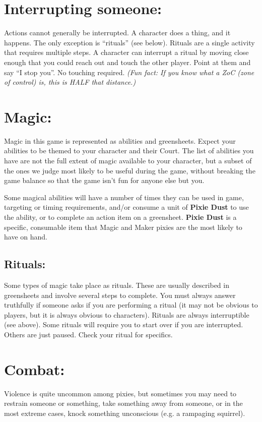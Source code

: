 \documentclass[sheet]{PP}
\begin{document}

\section*{Interrupting someone:}
Actions cannot generally be interrupted. A character does a thing, and it happens. The only exception is ``rituals'' (see below). Rituals are a single activity that requires multiple steps. A character can interrupt a ritual by moving close enough that you could reach out and touch the other player. Point at them and say ``I stop you''. No touching required. \textit{(Fun fact: If you know what a ZoC (zone of control) is, this is HALF that distance.)}

\section*{Magic:}
Magic in this game is represented as abilities and greensheets. Expect your abilities to be themed to your character and their Court. The list of abilities you have are not the full extent of magic available to your character, but a subset of the ones we judge most likely to be useful during the game, without breaking the game balance so that the game isn’t fun for anyone else but you.

Some magical abilities will have a number of times they can be used in game, targeting or timing requirements, and/or consume a unit of \textbf{Pixie Dust} to use the ability, or to complete an action item on a greensheet. \textbf{Pixie Dust} is a specific, consumable item that Magic and Maker pixies are the most likely to have on hand.

\subsection*{Rituals:}
Some types of magic take place as rituals. These are usually described in greensheets and involve several steps to complete. You must always answer truthfully if someone asks if you are performing a ritual (it may not be obvious to players, but it is always obvious to characters). Rituals are always interruptible (see above). Some rituals will require you to start over if you are interrupted. Others are just paused. Check your ritual for specifics.

\section*{Combat:}
Violence is quite uncommon among pixies, but sometimes you may need to restrain someone or something, take something away from someone, or in the most extreme cases, knock something unconscious (e.g. a rampaging squirrel).
\end{document}
